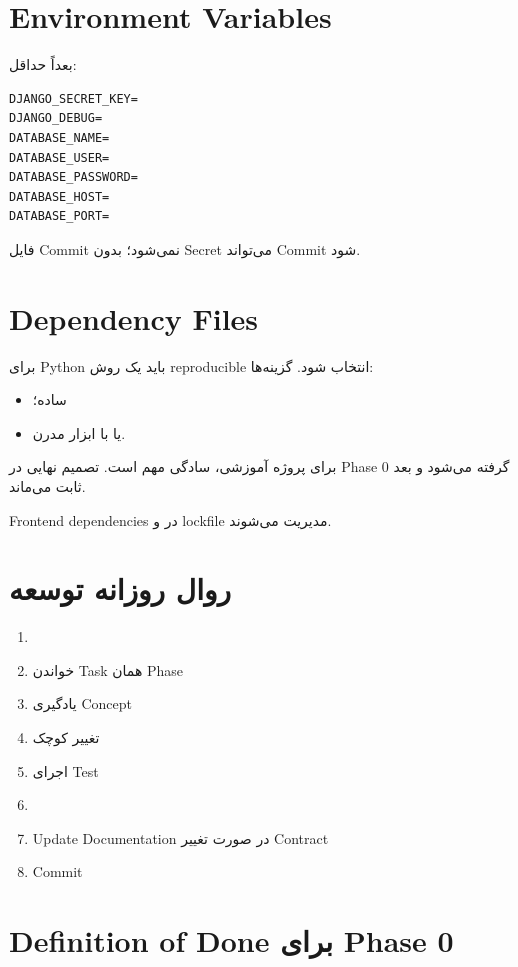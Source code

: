 \section{Environment Variables}

بعداً حداقل:
\begin{latin}
\begin{lstlisting}
DJANGO_SECRET_KEY=
DJANGO_DEBUG=
DATABASE_NAME=
DATABASE_USER=
DATABASE_PASSWORD=
DATABASE_HOST=
DATABASE_PORT=
\end{lstlisting}
\end{latin}

فایل  Commit نمی‌شود؛  بدون Secret می‌تواند Commit شود.

\section{Dependency Files}

برای Python باید یک روش reproducible انتخاب شود. گزینه‌ها:
\begin{itemize}
  \item {} ساده؛
  \item یا  با ابزار مدرن.
\end{itemize}

برای پروژه آموزشی، سادگی مهم است. تصمیم نهایی در Phase 0 گرفته می‌شود و بعد ثابت می‌ماند.

Frontend dependencies در  و lockfile مدیریت می‌شوند.

\section{روال روزانه توسعه}

\begin{enumerate}
  \item {}
  \item خواندن Task همان Phase
  \item یادگیری Concept
  \item تغییر کوچک
  \item اجرای Test
  \item {}
  \item Update Documentation در صورت تغییر Contract
  \item Commit
\end{enumerate}

\section{Definition of Done برای Phase 0}

